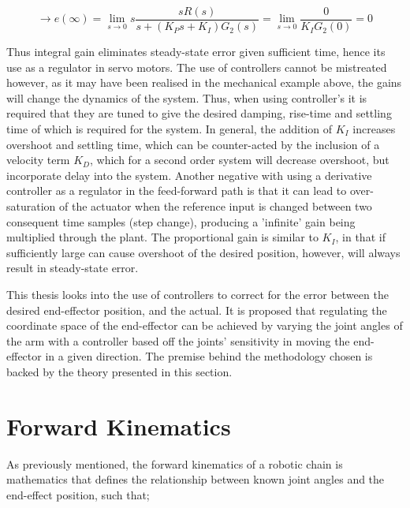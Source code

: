 \documentclass[12pt,openany,a4paper]{book}
\begin{document}
\vspace{\baselineskip}

\begin{equation}
 \rightarrow e(\infty) = \lim_{s\to0} s   \frac{s   R(s)}{s + (K_P s + K_I) G_2(s)} = \lim_{s\to0} \frac{0}{K_I G_2 (0)} = 0
\end{equation}
\vspace{\baselineskip}

Thus integral gain eliminates steady-state error given sufficient time, hence its use as a regulator in servo motors. The use of controllers cannot be mistreated however, as it may have been realised in the mechanical example above, the gains will change the dynamics of the system. Thus, when using controller's it is required that they are tuned to give the desired damping, rise-time and settling time of which is required for the system. In general, the addition of $K_I$ increases overshoot and settling time, which can be counter-acted by the inclusion of a velocity term $K_D$, which for a second order system will decrease overshoot, but incorporate delay into the system. Another negative with using a derivative controller as a regulator in the feed-forward path is that it can lead to over-saturation of the actuator when the reference input is changed between two consequent time samples (step change), producing a 'infinite' gain being multiplied through the plant. The proportional gain is similar to $K_I$, in that if sufficiently large can cause overshoot of the desired position, however, will always result in steady-state error.

This thesis looks into the use of controllers to correct for the error between the desired end-effector position, and the actual. It is proposed that regulating the coordinate space of the end-effector can be achieved by varying the joint angles of the arm with a controller based off the joints' sensitivity in moving the end-effector in a given direction. The premise behind the methodology chosen is backed by the theory presented in this section.\\


\section{Forward Kinematics}
As previously mentioned, the forward kinematics of a robotic chain is mathematics that defines the relationship between known joint angles and the end-effect position, such that;
\end{document}

